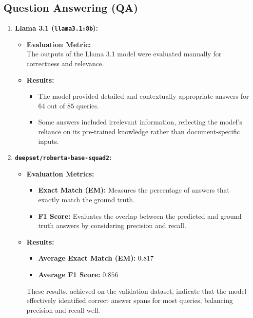 \documentclass{article}
\begin{document}
\subsection{Question Answering (QA)}
\begin{enumerate}
    \item \textbf{Llama 3.1 (\texttt{llama3.1:8b}):}
    \begin{itemize}
        \item \textbf{Evaluation Metric:}\\
        The outputs of the Llama 3.1 model were evaluated manually for correctness and relevance.
        \item \textbf{Results:}
        \begin{itemize}
            \item The model provided detailed and contextually appropriate answers for $64$ out of $85$ queries.
            \item Some answers included irrelevant information, reflecting the model’s reliance on its pre-trained knowledge rather than document-specific inputs.
        \end{itemize}
    \end{itemize}
    \item \textbf{\texttt{deepset/roberta-base-squad2}:}
    \begin{itemize}
        \item \textbf{Evaluation Metrics:}
        \begin{itemize}
            \item \textbf{Exact Match (EM):} Measures the percentage of answers that exactly match the ground truth.
            \item \textbf{F1 Score:} Evaluates the overlap between the predicted and ground truth answers by considering precision and recall.
        \end{itemize}
        \item \textbf{Results:}
        \begin{itemize}
            \item \textbf{Average Exact Match (EM):} $0.817$
            \item \textbf{Average F1 Score:} $0.856$
        \end{itemize}
        These results, achieved on the validation dataset, indicate that the model effectively identified correct answer spans for most queries, balancing precision and recall well.
    \end{itemize}
\end{enumerate}
\end{document}
